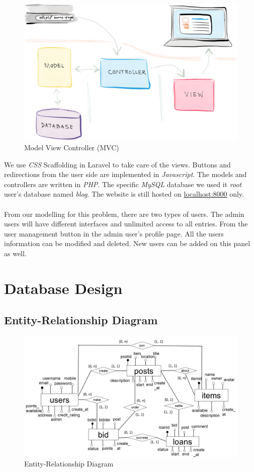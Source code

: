 \begin{figure}[h]
      \centering
	\includegraphics[scale=0.2]{MVC_framework.png}
      \caption{Model View Controller (MVC)}
\end{figure}

We use \textit{CSS} Scaffolding in Laravel to take care of the views. Buttons and redirections from the user side are implemented in \textit{Javascript}. The models and controllers are written in \textit{PHP}. The specific \textit{MySQL} database we used it \textit{root} user's database named \textit{blog}. The website is still hosted on \url{localhost:8000} only.\\
\\
From our modelling for this problem, there are two types of users. The admin users will have different interfaces and unlimited access to all entries. From the user management button in the admin user's profile page. All the users information can be modified and deleted. New users can be added on this panel as well.

\section{Database Design}

\subsection{Entity-Relationship Diagram}
\begin{figure}[h]
      \centering
	\includegraphics[scale=0.5]{er.jpg}
      \caption{Entity-Relationship Diagram}
\end{figure}

